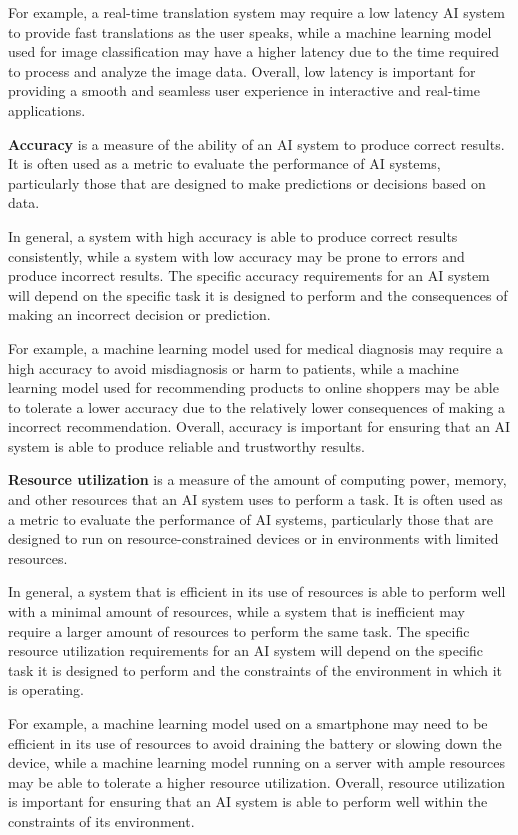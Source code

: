 For example, a real-time translation system may require a low latency AI system to provide fast 
translations as the user speaks, while a machine learning model used for image classification may 
have a higher latency due to the time required to process and analyze the image data. Overall, low 
latency is important for providing a smooth and seamless user experience in interactive and real-time applications.

\textbf{Accuracy} is a measure of the ability of an AI system to produce correct results.
It is often used as a metric to evaluate the performance of AI systems, particularly
those that are designed to make predictions or decisions based on data.

In general, a system with high accuracy is able to produce correct results consistently,
while a system with low accuracy may be prone to errors and produce incorrect results.
The specific accuracy requirements for an AI system will depend on the specific task it is
designed to perform and the consequences of making an incorrect decision or prediction.

For example, a machine learning model used for medical diagnosis may require a
high accuracy to avoid misdiagnosis or harm to patients, while a machine learning model
used for recommending products to online shoppers may be able to tolerate a lower accuracy due to
the relatively lower consequences of making a incorrect recommendation. Overall, accuracy is important for 
ensuring that an AI system is able to produce reliable and trustworthy results.

\textbf{Resource utilization} is a measure of the amount of computing power, memory, and other 
resources that an AI system uses to perform a task.
It is often used as a metric to evaluate the performance of AI systems, particularly those that 
are designed to run on resource-constrained devices or in environments with limited resources.

In general, a system that is efficient in its use of resources is able to perform well with a 
minimal amount of resources, while a system that is inefficient may require a larger amount of 
resources to perform the same task. The specific resource utilization requirements for an AI system 
will depend on the specific task it is designed to perform and the constraints of the environment 
in which it is operating.

For example, a machine learning model used on a smartphone may need to be efficient in its use of 
resources to avoid draining the battery or slowing down the device, while a machine learning model 
running on a server with ample resources may be able to tolerate a higher resource utilization. 
Overall, resource utilization is important for ensuring that an AI system is able to perform well within 
the constraints of its environment.

